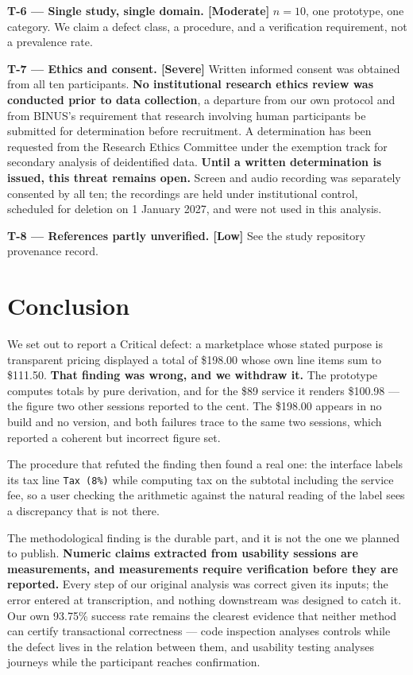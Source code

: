 \documentclass[conference]{IEEEtran}
\begin{document}
\textbf{T-6 --- Single study, single domain. [Moderate]} $n = 10$, one prototype, one category. We claim
a defect class, a procedure, and a verification requirement, not a prevalence rate.

\textbf{T-7 --- Ethics and consent. [Severe]} Written informed consent was obtained from all ten
participants. \textbf{No institutional research ethics review was conducted prior to data collection},
a departure from our own protocol and from BINUS's requirement that research involving human
participants be submitted for determination before recruitment. A determination has been requested from
the Research Ethics Committee under the exemption track for secondary analysis of deidentified data.
\textbf{Until a written determination is issued, this threat remains open.} Screen and audio recording
was separately consented by all ten; the recordings are held under institutional control, scheduled for
deletion on 1 January 2027, and were not used in this analysis.

\textbf{T-8 --- References partly unverified. [Low]} See the study repository provenance record.

\section{Conclusion}

We set out to report a Critical defect: a marketplace whose stated purpose is transparent pricing
displayed a total of \$198.00 whose own line items sum to \$111.50. \textbf{That finding was wrong, and we
withdraw it.} The prototype computes totals by pure derivation, and for the \$89 service it renders
\$100.98 --- the figure two other sessions reported to the cent. The \$198.00 appears in no build and no
version, and both failures trace to the same two sessions, which reported a coherent but incorrect
figure set.

The procedure that refuted the finding then found a real one: the interface labels its tax line
\texttt{Tax (8\%)} while computing tax on the subtotal including the service fee, so a user checking the
arithmetic against the natural reading of the label sees a discrepancy that is not there.

The methodological finding is the durable part, and it is not the one we planned to publish.
\textbf{Numeric claims extracted from usability sessions are measurements, and measurements require
verification before they are reported.} Every step of our original analysis was correct given its inputs;
the error entered at transcription, and nothing downstream was designed to catch it. Our own 93.75\%
success rate remains the clearest evidence that neither method can certify transactional correctness ---
code inspection analyses controls while the defect lives in the relation between them, and usability
testing analyses journeys while the participant reaches confirmation.
\end{document}
